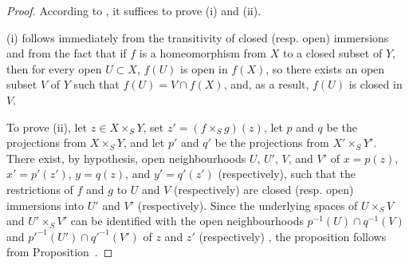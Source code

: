 \begin{proof}
According to , it suffices to prove (i) and (ii).

(i) follows immediately from the transitivity of closed (resp. open) immersions  and from the fact that if $f$ is a homeomorphism from $X$ to a closed subset of $Y$, then for every open $U\subset X$, $f(U)$ is open in $f(X)$, so there exists an open subset $V$ of $Y$ such that $f(U)=V\cap f(X)$, and, as a result, $f(U)$ is closed in $V$.

To prove (ii), let $z\in X\times_S Y$, set $z'=(f\times_S g)(z)$, let $p$ and $q$ be the projections from $X\times_S Y$, and let $p'$ and $q'$ be the projections from $X'\times_S Y'$.
There exist, by hypothesis, open neighbourhoods $U$, $U'$, $V$, and $V'$ of $x=p(z)$, $x'=p'(z')$, $y=q(z)$, and $y'=q'(z')$ (respectively), such that the restrictions of $f$ and $g$ to $U$ and $V$ (respectively) are closed (resp. open) immersions into $U'$ and $V'$ (respectively).
Since the underlying spaces of $U\times_S V$ and $U'\times_S V'$ can be identified with the open neighbourhoods $p^{-1}(U)\cap q^{-1}(V)$ and ${p'}^{-1}(U')\cap{q'}^{-1}(V')$ of $z$ and $z'$ (respectively) , the proposition follows from Proposition~.
\end{proof}
